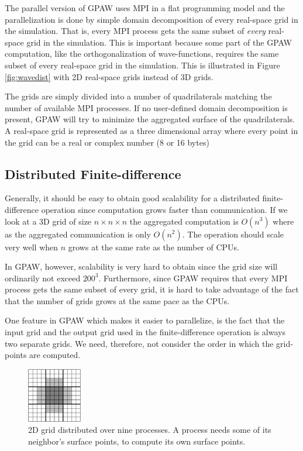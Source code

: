 \documentclass[preprint,3p,times,twocolumn]{elsarticle}
\begin{document}
The parallel version of GPAW uses MPI in a flat programming model and the parallelization is done by simple domain decomposition of every real-space grid in the simulation. That is, every MPI process gets the same subset of \emph{every} real-space grid in the simulation. This is important because some part of the GPAW computation, like the orthogonalization of wave-functions, requires the same subset of every real-space grid in the simulation. This is illustrated in Figure \ref{fig:wavedist} with 2D real-space grids instead of 3D grids.

The grids are simply divided into a number of quadrilaterals matching the number of available MPI processes. If no user-defined domain decomposition is present, GPAW will try to minimize the aggregated surface of the quadrilaterals. A real-space grid is represented as a three dimensional array where every point in the grid can be a real or complex number (8 or 16 bytes)

\subsection{Distributed Finite-difference}
Generally, it should be easy to obtain good scalability for a distributed finite-difference operation since computation grows faster than communication. If we look at a 3D grid of size $n \times n \times n$ the aggregated computation is $O\left(n^3\right)$ where as the aggregated communication is only $O\left(n^2\right)$. The operation should scale very well when $n$ grows at the same rate as the number of CPUs.

In GPAW, however, scalability is very hard to obtain since the grid size will ordinarily not exceed $200^3$. Furthermore, since GPAW requires that every MPI process gets the same subset of every grid, it is hard to take advantage of the fact that the number of grids grows at the same pace as the CPUs.

One feature in GPAW which makes it easier to parallelize, is the fact that the input grid and the output grid used in the finite-difference operation is always two separate grids. We need, therefore, not consider the order in which the grid-points are computed.

\begin{figure}
 \centering
 \includegraphics[width=90px]{gfx/diststencil}
 \caption{2D grid distributed over nine processes. A process needs some of its neighbor's surface points, to compute its own surface points.}
 \label{fig:diststencil}
\end{figure}
\end{document}
